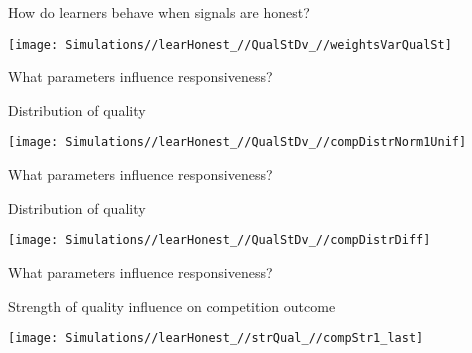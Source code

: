 \documentclass[
  ignorenonframetext,
]{beamer}
\begin{document}
\begin{frame}{How do learners behave when signals are honest?}
\protect\hypertarget{how-do-learners-behave-when-signals-are-honest}{}

\texttt{[image: Simulations//learHonest\_//QualStDv\_//weightsVarQualSt]}

\end{frame}

\begin{frame}{What parameters influence responsiveness?}
\protect\hypertarget{what-parameters-influence-responsiveness}{}

\begin{block}{Distribution of quality}

\begin{center}\texttt{[image: Simulations//learHonest\_//QualStDv\_//compDistrNorm1Unif]} \end{center}

\end{block}

\end{frame}

\begin{frame}{What parameters influence responsiveness?}
\protect\hypertarget{what-parameters-influence-responsiveness-1}{}

\begin{block}{Distribution of quality}

\begin{center}\texttt{[image: Simulations//learHonest\_//QualStDv\_//compDistrDiff]} \end{center}

\end{block}

\end{frame}

\begin{frame}{What parameters influence responsiveness?}
\protect\hypertarget{what-parameters-influence-responsiveness-2}{}

\begin{block}{Strength of quality influence on competition outcome}

\begin{center}\texttt{[image: Simulations//learHonest\_//strQual\_//compStr1\_last]} \end{center}

\end{block}

\end{frame}
\end{document}

